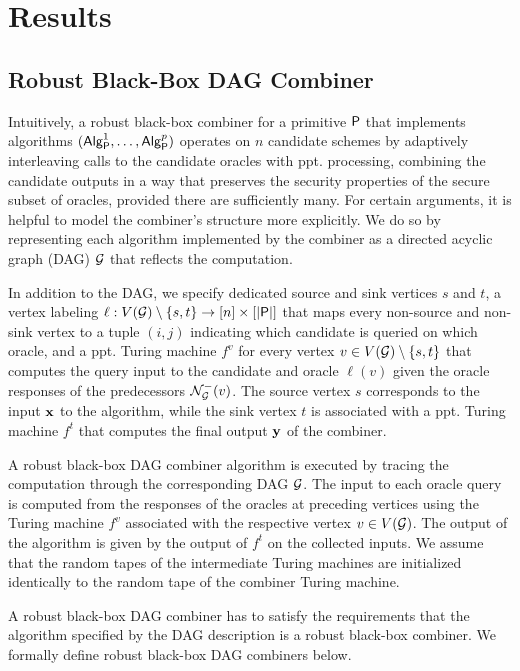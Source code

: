 \chapter{Results}
\label{ch:analysis}

\section{Robust Black-Box DAG Combiner}
Intuitively, a robust black-box combiner for a primitive $ \textup{\textsf{P}} $ that implements algorithms
$(\alg{Alg}{P}^1, \ldots, \alg{Alg}{P}^p)$ operates on $n$ candidate schemes by 
adaptively interleaving calls to the candidate oracles with ppt. processing, combining the candidate
outputs in a way that preserves the security properties of the secure subset of oracles,
provided there are sufficiently many. For certain arguments, it is helpful to model the combiner's
structure more explicitly. We do so by representing each algorithm implemented 
by the combiner as a directed acyclic graph (DAG) $\mathcal{G}$ that reflects the computation.

In addition to the DAG, we specify dedicated source and sink vertices $s$ and $t$, a vertex 
labeling $\ell: V(\mathcal{G}) \setminus \{s,t\} \to [n] \times [| \textup{\textsf{P}} |]$ that maps every non-source and non-sink
vertex to a tuple $(i,j)$ indicating which candidate is queried on which oracle, and a ppt. Turing machine 
$f^v$ for every vertex $v \in V(\mathcal{G}) \setminus \{s,t\}$ that computes the query input to the candidate and oracle
$\ell(v)$ given the oracle responses of the predecessors $\mathcal N_{\mathcal{G}}^-(v)$.
The source vertex $s$ corresponds to the input $\mathbf{x}$ to the algorithm, while the sink vertex $t$
is associated with a ppt. Turing machine $f^t$ that computes the final output $\mathbf{y}$ of the combiner.

A robust black-box DAG combiner algorithm is executed by tracing the computation through the corresponding DAG $\mathcal{G}$.
The input to each oracle query is computed from the responses of the oracles at preceding vertices using the Turing machine $f^v$ associated
with the respective vertex $v \in V(\mathcal{G})$. The output of the algorithm is given by the output of $f^t$ on the collected inputs. We assume 
that the random tapes of the intermediate Turing machines are initialized identically to the random tape of the combiner Turing machine.

A robust black-box DAG combiner has to satisfy the requirements that the algorithm specified by the DAG description 
is a robust black-box combiner. We formally define robust black-box DAG combiners below. 

